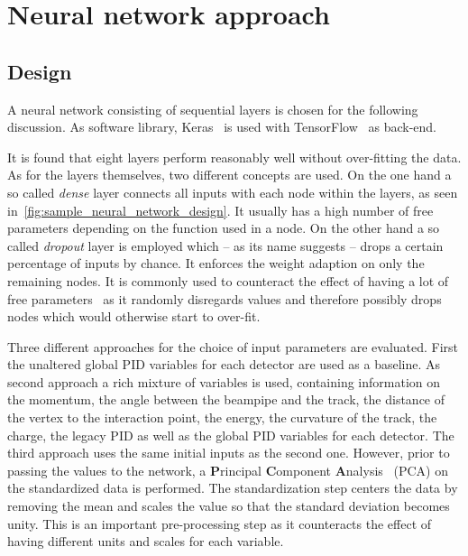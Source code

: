 \section{Neural network approach}
\label{sec:neural_network_approach}

\subsection{Design}
\label{sec:neural_network_design}

A neural network consisting of sequential layers is chosen for the following discussion. As software library, Keras~\cite{chollet2015keras} is used with TensorFlow~\cite{tensorflow2015-whitepaper} as back-end.

It is found that eight layers perform reasonably well without over-fitting the data. As for the layers themselves, two different concepts are used. On the one hand a so called \textit{dense} layer connects all inputs with each node within the layers, as seen in~\autoref{fig:sample_neural_network_design}. It usually has a high number of free parameters depending on the function used in a node. On the other hand a so called \textit{dropout} layer is employed which -- as its name suggests -- drops a certain percentage of inputs by chance. It enforces the weight adaption on only the remaining nodes. It is commonly used to counteract the effect of having a lot of free parameters~\cite{Goodfellow:DeepLearning} as it randomly disregards values and therefore possibly drops nodes which would otherwise start to over-fit.

Three different approaches for the choice of input parameters are evaluated. First the unaltered global PID variables for each detector are used as a baseline. As second approach a rich mixture of variables is used, containing information on the momentum, the angle between the beampipe and the track, the distance of the vertex to the interaction point, the energy, the curvature of the track, the charge, the legacy PID as well as the global PID variables for each detector. The third approach uses the same initial inputs as the second one. However, prior to passing the values to the network, a \textbf{P}rincipal \textbf{C}omponent \textbf{A}nalysis~\cite{Pearson:LinesAndPlanes} (PCA) on the standardized data is performed. The standardization step centers the data by removing the mean and scales the value so that the standard deviation becomes unity. This is an important pre-processing step as it counteracts the effect of having different units and scales for each variable.


